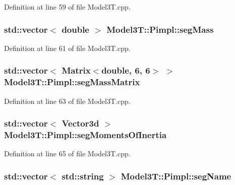 Definition at line 59 of file Model3\+T.\+cpp.

\subsubsection[{\texorpdfstring{seg\+Mass}{segMass}}]{\setlength{\rightskip}{0pt plus 5cm}std\+::vector$<$ double $>$ Model3\+T\+::\+Pimpl\+::seg\+Mass}\hypertarget{structModel3T_1_1Pimpl_a96656676ff3aa9cddb99f58f453786c7}{}\label{structModel3T_1_1Pimpl_a96656676ff3aa9cddb99f58f453786c7}


Definition at line 61 of file Model3\+T.\+cpp.

\subsubsection[{\texorpdfstring{seg\+Mass\+Matrix}{segMassMatrix}}]{\setlength{\rightskip}{0pt plus 5cm}std\+::vector$<$ Matrix$<$double, 6, 6$>$ $>$ Model3\+T\+::\+Pimpl\+::seg\+Mass\+Matrix}\hypertarget{structModel3T_1_1Pimpl_a7d3d20f64bbe278275b6e74a49ebf9f6}{}\label{structModel3T_1_1Pimpl_a7d3d20f64bbe278275b6e74a49ebf9f6}


Definition at line 63 of file Model3\+T.\+cpp.

\subsubsection[{\texorpdfstring{seg\+Moments\+Of\+Inertia}{segMomentsOfInertia}}]{\setlength{\rightskip}{0pt plus 5cm}std\+::vector$<$ Vector3d $>$ Model3\+T\+::\+Pimpl\+::seg\+Moments\+Of\+Inertia}\hypertarget{structModel3T_1_1Pimpl_a4c64f2048ff9ce34719e3ea2a384a263}{}\label{structModel3T_1_1Pimpl_a4c64f2048ff9ce34719e3ea2a384a263}


Definition at line 65 of file Model3\+T.\+cpp.

\subsubsection[{\texorpdfstring{seg\+Name}{segName}}]{\setlength{\rightskip}{0pt plus 5cm}std\+::vector$<$ std\+::string $>$ Model3\+T\+::\+Pimpl\+::seg\+Name}\hypertarget{structModel3T_1_1Pimpl_a2cab0a9da7f7c37d10152cac8c8e6cfc}{}\label{structModel3T_1_1Pimpl_a2cab0a9da7f7c37d10152cac8c8e6cfc}


